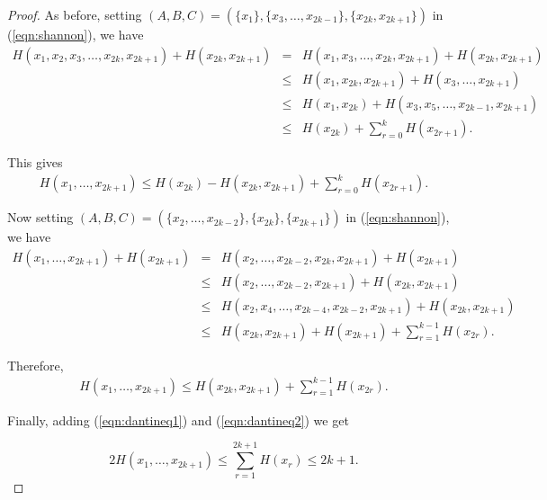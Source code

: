 \begin{proof}
	
 As before, setting $(A, B, C) = (\{ x_1 \}, \{ x_3, \dots, x_{2k - 1} \}, \{ x_{2k}, x_{2k + 1} \})$ in (\ref{eqn:shannon}), we have
\begin{eqnarray*}
 H(x_1, x_2, x_3, \dots, x_{2k}, x_{2k + 1}) + H(x_{2k}, x_{2k + 1}) & = & H(x_1, x_3, \dots, x_{2k}, x_{2k + 1}) + H(x_{2k}, x_{2k + 1}) \\
                           & \leq & H(x_1, x_{2k}, x_{2k + 1}) + H(x_3, \dots, x_{2k + 1}) \\
                           & \leq & H(x_1, x_{2k}) + H(x_3, x_5, \dots, x_{2k - 1}, x_{2k + 1}) \\
                           & \leq & H(x_{2k}) + \sum_{r = 0}^k H(x_{2r + 1}).
\end{eqnarray*}

This gives
\begin{eqnarray}
 H(x_1, \dots, x_{2k + 1}) \leq H(x_{2k}) - H(x_{2k}, x_{2k + 1}) + \sum_{r = 0}^k H(x_{2r + 1}) \label{eqn:dantineq1}.
\end{eqnarray}

Now setting $(A, B, C) = (\{ x_2, \dots, x_{2k - 2} \}, \{ x_{2k} \}, \{ x_{2k + 1} \})$ in (\ref{eqn:shannon}), we have
\begin{eqnarray*}
 H(x_1, \dots, x_{2k + 1}) + H(x_{2k + 1}) & = & H(x_2, \dots, x_{2k - 2}, x_{2k}, x_{2k + 1}) + H(x_{2k + 1}) \\
                           & \leq & H(x_2, \dots, x_{2k - 2}, x_{2k + 1}) + H(x_{2k}, x_{2k + 1}) \\
                           & \leq & H(x_2, x_4, \dots, x_{2k - 4}, x_{2k - 2}, x_{2k + 1}) + H(x_{2k}, x_{2k + 1}) \\
                           & \leq & H(x_{2k}, x_{2k + 1}) + H(x_{2k + 1}) + \sum_{r = 1} ^{k - 1} H(x_{2r}).
\end{eqnarray*}

Therefore,
\begin{eqnarray}
 H(x_1, \dots, x_{2k + 1}) \leq H(x_{2k}, x_{2k + 1}) + \sum_{r = 1} ^{k - 1} H(x_{2r}) \label{eqn:dantineq2}.
\end{eqnarray}

Finally, adding (\ref{eqn:dantineq1}) and (\ref{eqn:dantineq2}) we get

\[ 2H(x_1, \dots, x_{2k + 1}) \leq \sum_{r = 1} ^{2k + 1} H(x_{r}) \leq 2k + 1. \]
\end{proof}


